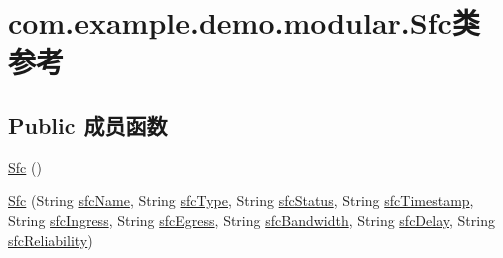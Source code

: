 \hypertarget{classcom_1_1example_1_1demo_1_1modular_1_1_sfc}{}\section{com.\+example.\+demo.\+modular.\+Sfc类 参考}
\label{classcom_1_1example_1_1demo_1_1modular_1_1_sfc}
\subsection*{Public 成员函数}
\begin{DoxyCompactItemize}
\item 
\mbox{\hyperlink{classcom_1_1example_1_1demo_1_1modular_1_1_sfc_a431b01988555774f9d3747110cc4e9a6}{Sfc}} ()
\item 
\mbox{\hyperlink{classcom_1_1example_1_1demo_1_1modular_1_1_sfc_a822a123b9e17f6b390893a1a52fad92e}{Sfc}} (String \mbox{\hyperlink{classcom_1_1example_1_1demo_1_1modular_1_1_sfc_a85b084e096b77104d6aa0e95cd4bd0f1}{sfc\+Name}}, String \mbox{\hyperlink{classcom_1_1example_1_1demo_1_1modular_1_1_sfc_a5c4b85dd7191b225e0de4a9b54d09400}{sfc\+Type}}, String \mbox{\hyperlink{classcom_1_1example_1_1demo_1_1modular_1_1_sfc_aef4582f35cc35919c5384cdee5c20c32}{sfc\+Status}}, String \mbox{\hyperlink{classcom_1_1example_1_1demo_1_1modular_1_1_sfc_ad08b3121bf8fb27334db93307b052824}{sfc\+Timestamp}}, String \mbox{\hyperlink{classcom_1_1example_1_1demo_1_1modular_1_1_sfc_a56183d5e87ad5eefd0a6bc3a80244c86}{sfc\+Ingress}}, String \mbox{\hyperlink{classcom_1_1example_1_1demo_1_1modular_1_1_sfc_a399543ab700135a2ab190a508d898ea1}{sfc\+Egress}}, String \mbox{\hyperlink{classcom_1_1example_1_1demo_1_1modular_1_1_sfc_a57d1d7ebc46372af945f9ddbea5cc063}{sfc\+Bandwidth}}, String \mbox{\hyperlink{classcom_1_1example_1_1demo_1_1modular_1_1_sfc_a7bfb3b587900390e0e9459a419fafabe}{sfc\+Delay}}, String \mbox{\hyperlink{classcom_1_1example_1_1demo_1_1modular_1_1_sfc_a7979940d0a89b6111782fbfe339c84a0}{sfc\+Reliability}})
\item 

\end{DoxyCompactItemize}
